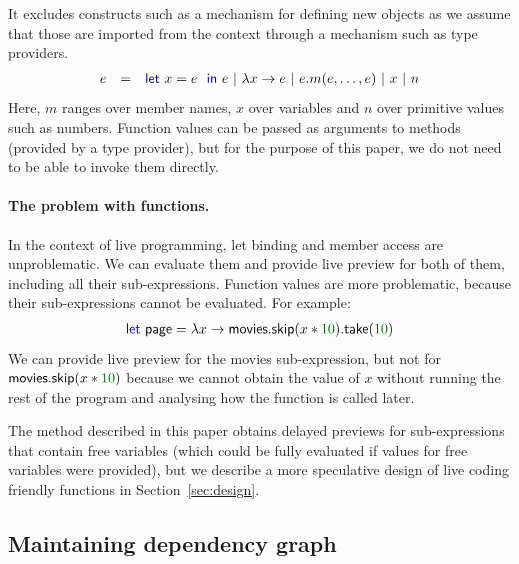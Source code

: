 \documentclass[sigplan,10pt]{acmart}\settopmatter{printfolios=true,printccs=false,printacmref=false}
\theoremstyle{plain}
\theoremstyle{definition}
\newcommand{\num}[1]{\textcolor{numclr}{#1}}
\newcommand{\ident}[1]{\textnormal{\sffamily #1}}
\newcommand{\kvd}[1]{\textnormal{\textcolor{kvdclr}{\sffamily #1}}}
\begin{document}
It excludes constructs such as a mechanism for defining new objects as we assume that those
are imported from the context through a mechanism such as type providers.
%
\begin{equation*}
\begin{array}{lcl}
e &=& \kvd{let}~x = e~\kvd{in}~e ~|~ \lambda x\rightarrow e ~|~ e.m(e, \ldots, e) ~|~ x ~|~ n
\end{array}
\end{equation*}
%
Here, $m$ ranges over member names, $x$ over variables and $n$ over primitive values such as 
numbers. Function values can be passed as arguments to methods (provided by a type provider), but 
for the purpose of this paper, we do not need to be able to invoke them directly.

\paragraph{The problem with functions.}
In the context of live programming, \kvd{let} binding and member access are unproblematic.
We can evaluate them and provide live preview for both of them, including all their sub-expressions.
Function values are more problematic, because their sub-expressions cannot be evaluated. For example:
%
\begin{equation*}
\begin{array}{l}
\kvd{let}~\ident{page} = \lambda x \rightarrow \ident{movies}.\ident{skip}(x*\num{10}).\ident{take}(\num{10})
\end{array}
\end{equation*}
%
We can provide live preview for the \ident{movies} sub-expression, but not for 
$\ident{movies}.\ident{skip}(x*\num{10})$ because we cannot obtain the value of $x$ without
running the rest of the program and analysing how the function is called later.

The method described in this paper obtains delayed previews for sub-expressions that contain
free variables (which could be fully evaluated if values for free variables were provided), but
we describe a more speculative design of live coding friendly functions in Section~\ref{sec:design}.


\subsection{Maintaining dependency graph}
\label{sec:formal-deps}
\end{document}
